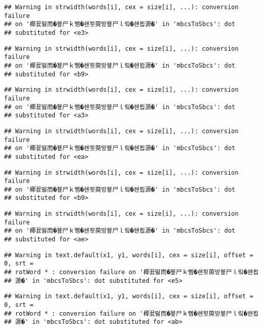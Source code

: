 \documentclass[]{article}
\begin{document}
\begin{verbatim}
## Warning in strwidth(words[i], cex = size[i], ...): conversion failure
## on '椰꾨떯而�뵾尸ｋ뻼�쇈묏萸방뵾尸ｌ맄�쇈묍源�' in 'mbcsToSbcs': dot
## substituted for <e3>
\end{verbatim}

\begin{verbatim}
## Warning in strwidth(words[i], cex = size[i], ...): conversion failure
## on '椰꾨떯而�뵾尸ｋ뻼�쇈묏萸방뵾尸ｌ맄�쇈묍源�' in 'mbcsToSbcs': dot
## substituted for <b9>
\end{verbatim}

\begin{verbatim}
## Warning in strwidth(words[i], cex = size[i], ...): conversion failure
## on '椰꾨떯而�뵾尸ｋ뻼�쇈묏萸방뵾尸ｌ맄�쇈묍源�' in 'mbcsToSbcs': dot
## substituted for <a3>
\end{verbatim}

\begin{verbatim}
## Warning in strwidth(words[i], cex = size[i], ...): conversion failure
## on '椰꾨떯而�뵾尸ｋ뻼�쇈묏萸방뵾尸ｌ맄�쇈묍源�' in 'mbcsToSbcs': dot
## substituted for <ea>
\end{verbatim}

\begin{verbatim}
## Warning in strwidth(words[i], cex = size[i], ...): conversion failure
## on '椰꾨떯而�뵾尸ｋ뻼�쇈묏萸방뵾尸ｌ맄�쇈묍源�' in 'mbcsToSbcs': dot
## substituted for <b9>
\end{verbatim}

\begin{verbatim}
## Warning in strwidth(words[i], cex = size[i], ...): conversion failure
## on '椰꾨떯而�뵾尸ｋ뻼�쇈묏萸방뵾尸ｌ맄�쇈묍源�' in 'mbcsToSbcs': dot
## substituted for <ae>
\end{verbatim}

\begin{verbatim}
## Warning in text.default(x1, y1, words[i], cex = size[i], offset = 0, srt =
## rotWord * : conversion failure on '椰꾨떯而�뵾尸ｋ뻼�쇈묏萸방뵾尸ｌ맄�쇈묍
## 源�' in 'mbcsToSbcs': dot substituted for <e5>
\end{verbatim}

\begin{verbatim}
## Warning in text.default(x1, y1, words[i], cex = size[i], offset = 0, srt =
## rotWord * : conversion failure on '椰꾨떯而�뵾尸ｋ뻼�쇈묏萸방뵾尸ｌ맄�쇈묍
## 源�' in 'mbcsToSbcs': dot substituted for <ab>
\end{verbatim}
\end{document}
